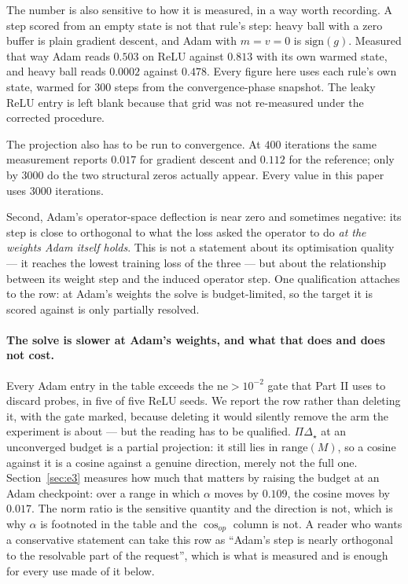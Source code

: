 \documentclass{article} %
\theoremstyle{plain}
\theoremstyle{definition}
\theoremstyle{remark}
\begin{document}
The number is also sensitive to how it is measured, in a way worth recording. A step scored from an
empty state is not that rule's step: heavy ball with a zero buffer is plain gradient descent, and
Adam with $m = v = 0$ is $\mathrm{sign}(g)$. Measured that way Adam reads $0.503$ on ReLU against
$0.813$ with its own warmed state, and heavy ball reads $0.0002$ against $0.478$. Every figure here
uses each rule's own state, warmed for $300$ steps from the convergence-phase snapshot. The leaky
ReLU entry is left blank because that grid was not re-measured under the corrected procedure.

The projection also has to be run to convergence. At $400$ iterations the same measurement reports
$0.017$ for gradient descent and $0.112$ for the reference; only by $3000$ do the two structural
zeros actually appear. Every value in this paper uses $3000$ iterations.

Second, Adam's operator-space deflection is near zero and sometimes negative: its step is close to
orthogonal to what the loss asked the operator to do \emph{at the weights Adam itself holds}. This
is not a statement about its optimisation quality --- it reaches the lowest training loss of the
three --- but about the relationship between its weight step and the induced operator step. One
qualification attaches to the row: at Adam's weights the solve is budget-limited, so the target it
is scored against is only partially resolved.

\paragraph{The solve is slower at Adam's weights, and what that does and does not cost.}
Every Adam entry in the table exceeds the $\mathrm{ne} > 10^{-2}$ gate that Part II uses to discard
probes, in five of five ReLU seeds. We report the row rather than deleting it, with the gate
marked, because deleting it would silently remove the arm the experiment is about --- but the
reading has to be qualified. $\Pi\Delta_\star$ at an unconverged budget is a partial projection: it
still lies in $\mathrm{range}(M)$, so a cosine against it is a cosine against a genuine direction,
merely not the full one. Section~\ref{sec:e3} measures how much that matters by raising the budget
at an Adam checkpoint: over a range in which $\alpha$ moves by $0.109$, the cosine moves by
$0.017$. The norm ratio is the sensitive quantity and the direction is not, which is why $\alpha$
is footnoted in the table and the $\cos_{op}$ column is not. A reader who wants a conservative
statement can take this row as ``Adam's step is nearly orthogonal to the resolvable part of the
request'', which is what is measured and is enough for every use made of it below.
\end{document}
